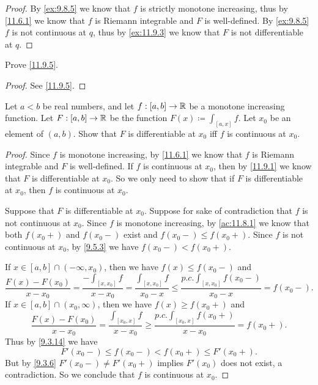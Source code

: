 \begin{proof}
  By \cref{ex:9.8.5} we know that \(f\) is strictly monotone increasing, thus by \cref{11.6.1} we know that \(f\) is Riemann integrable and \(F\) is well-defined.
  By \cref{ex:9.8.5} \(f\) is not continuous at \(q\), thus by \cref{ex:11.9.3} we know that \(F\) is not differentiable at \(q\).
\end{proof}

\begin{ex}\label{ex:11.9.2}
  Prove \cref{11.9.5}.
\end{ex}

\begin{proof}
  See \cref{11.9.5}.
\end{proof}

\begin{ex}\label{ex:11.9.3}
  Let \(a < b\) be real numbers, and let \(f : [a, b] \to \mathbb{R}\) be a monotone increasing function.
  Let \(F : [a, b] \to \mathbb{R}\) be the function \(F(x) \coloneqq \int_{[a, x]} f\).
  Let \(x_0\) be an element of \((a, b)\).
  Show that \(F\) is differentiable at \(x_0\) iff \(f\) is continuous at \(x_0\).
\end{ex}

\begin{proof}
  Since \(f\) is monotone increasing, by \cref{11.6.1} we know that \(f\) is Riemann integrable and \(F\) is well-defined.
  If \(f\) is continuous at \(x_0\), then by \cref{11.9.1} we know that \(F\) is differentiable at \(x_0\).
  So we only need to show that if \(F\) is differentiable at \(x_0\), then \(f\) is continuous at \(x_0\).

  Suppose that \(F\) is differentiable at \(x_0\).
  Suppose for sake of contradiction that \(f\) is not continuous at \(x_0\).
  Since \(f\) is monotone increasing, by \cref{ac:11.8.1} we know that both \(f(x_0+)\) and \(f(x_0-)\) exist and \(f(x_0-) \leq f(x_0+)\).
  Since \(f\) is not continuous at \(x_0\), by \cref{9.5.3} we have \(f(x_0-) < f(x_0+)\).

  If \(x \in [a, b] \cap (-\infty, x_0)\), then we have \(f(x) \leq f(x_0-)\) and
  \[
    \dfrac{F(x) - F(x_0)}{x - x_0} = \dfrac{-\int_{[x, x_0]} f}{x - x_0} = \dfrac{\int_{[x, x_0]} f}{x_0 - x} \leq \dfrac{p.c. \int_{[x, x_0]} f(x_0-)}{x_0 - x} = f(x_0-).
  \]
  If \(x \in [a, b] \cap (x_0, \infty)\), then we have \(f(x) \geq f(x_0+)\) and
  \[
    \dfrac{F(x) - F(x_0)}{x - x_0} = \dfrac{\int_{[x_0, x]} f}{x - x_0} \geq \dfrac{p.c. \int_{[x_0, x]} f(x_0+)}{x - x_0} = f(x_0+).
  \]
  Thus by \cref{9.3.14} we have
  \[
    F'(x_0-) \leq f(x_0-) < f(x_0+) \leq F'(x_0+).
  \]
  But by \cref{9.3.6} \(F'(x_0-) \neq F'(x_0+)\) implies \(F'(x_0)\) does not exist, a contradiction.
  So we conclude that \(f\) is continuous at \(x_0\).
\end{proof}